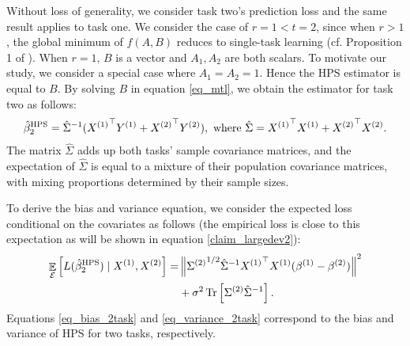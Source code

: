 Without loss of generality, we consider task two's prediction loss and the same result applies to task one.
We consider the case of $r = 1 < t = 2$, since when $r > 1$, the global minimum of $f(A, B)$ reduces to single-task learning (cf. Proposition 1 of \cite{WZR20}).
When $r = 1$, $B$ is a vector and $A_1, A_2$ are both scalars.
To motivate our study, we consider a special case where $A_1=A_2=1$.
Hence the HPS estimator is equal to $B$.
By solving $B$ in equation \eqref{eq_mtl}, we obtain the estimator for task two as follows:
\begin{align}
	\hat{\beta}_2^{\MTL} = {\hat{\Sigma}}^{-1} ({X^{(1)}}^{\top} Y^{(1)} + {X^{(2)}}^{\top} Y^{(2)}), \text{ where }
	\hat{\Sigma} = {X^{(1)}}^{\top} X^{(1)} + {X^{(2)}}^{\top} X^{(2)}. \label{def hatsig}
\end{align}
The matrix $\hat{\Sigma}$ adds up both tasks' sample covariance matrices, and the expectation of $\hat{\Sigma}$ is equal to a mixture of their population covariance matrices, with mixing proportions determined by their sample sizes.

To derive the bias and variance equation, we consider the expected loss conditional on the covariates as follows (the empirical loss is close to this expectation as will be shown in equation \eqref{claim_largedev2}):
\begin{align}
	 \exarg{\cE}{L(\hat{\beta}_2^{\MTL}) \mid X^{(1)}, X^{(2)}}
	=& \bignorm{{\Sigma^{(2)}}^{1/2} \hat{\Sigma}^{-1} {X^{(1)}}^{\top} X^{(1)} (\beta^{(1)} - \beta^{(2)})}^2 \label{eq_bias_2task} \\
	& + \sigma^2 \bigtr{\Sigma^{(2)}\hat{\Sigma}^{-1}}. \label{eq_variance_2task}
\end{align}
Equations \eqref{eq_bias_2task} and \eqref{eq_variance_2task} correspond to the bias and variance of HPS for two tasks, respectively.
\fi

